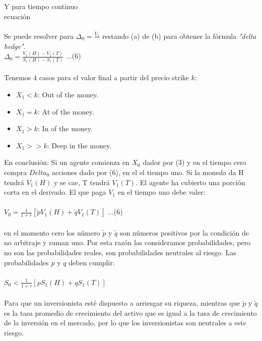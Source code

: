 \documentclass{article}
\begin{document}
        Y para tiempo continuo
        \\
        ecuación
        \\
        \\
        Se puede resolver para \(\Delta_0 = \frac{V_1}{}\) restando (a) de (b) para obtener la fórmula \textit{"delta hedge"}.
        \\
        \(\Delta_0 = \frac{V_1(H) - V_1(T)}{S_1(H) - S_1(T)}\) ...(6)
        \\
        \\
        Tenemos 4 casos para el valor final a partir del precio strike \(k\):
        \begin{itemize}
            \item \(X_1 < k\): Out of the money.
            \item \(X_1 = k\): At of the money.
            \item \(X_1 > k\): In of the money.
            \item \(X_1 >> k\): Deep in the money.
        \end{itemize}
        En conclusión:  Si un agente comienza en \( X_0 \) dador por (3) y en el tiempo cero
        compra \(Delta_0\) acciones dado por (6), en el el tiempo uno. Si la moneda da H
        tendrá \(V_1(H)\) y se cae, T tendrá \(V_1(T)\). El agente ha cubierto una porción corta
        en el derivado. El que paga \(V_1\) en el tiempo uno debe valer:
        \\
        \\
        \(V_0 = \frac{1}{1+r} [\tilde{p}V_1(H) + \tilde{q} V_1(T)]\) ...(6)
        \\
        \\
        en el momento cero los número \(\tilde{p}\) y \(\tilde{q}\) son números positivos por la condición de
        no arbitraje y suman uno. Por esta razón las consideramos probabilidades,
        pero no son las probabilidades reales, son probabilidades neutrales al riesgo. Las
        probabilidades \(p\) y \(q\) deben cumplir:
        \\
        \\
        \(S_0 < \frac{1}{1+r} [pS_1(H) + qS_1(T)]\)
        \\
        \\
        Para que un inversionista esté dispuesto a arriesgar su riqueza, mientras que
        \(\tilde{p}\) y \(\tilde{q}\) es la tasa promedio de crecimiento del activo que es igual a la tasa de
        crecimiento de la inversión en el mercado, por lo que los inversionistas son neutrales
        a este riesgo.
\end{document}
